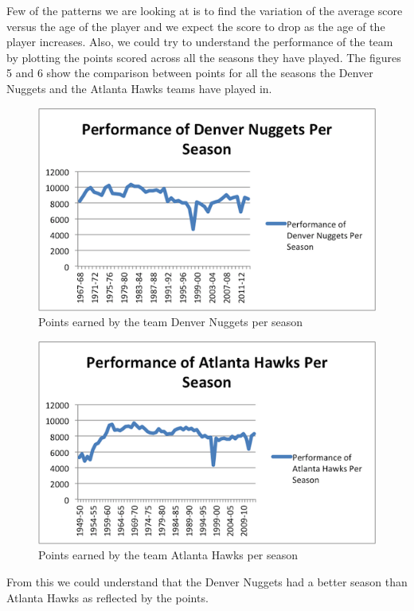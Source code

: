 \documentclass{acm_proc_article-sp}
\begin{document}
Few of the patterns we are looking at is to find the variation of the average score versus the age of the player and we expect the score to drop as the age of the player increases. Also, we could try to understand the performance of the team by plotting the points scored across all the seasons they have played. The figures 5 and 6 show the comparison between points for all the seasons the Denver Nuggets and the Atlanta Hawks teams have played in.

\begin{figure}[!htb]
\includegraphics{DN.png}
\caption{Points earned by the team Denver Nuggets per season}
\end{figure}

\begin{figure}[!htb]
\includegraphics{ATH.png}
\caption{Points earned by the team Atlanta Hawks per season}
\end{figure}

From this we could understand that the Denver Nuggets had a better season than Atlanta Hawks as reflected by the points.
\end{document}
